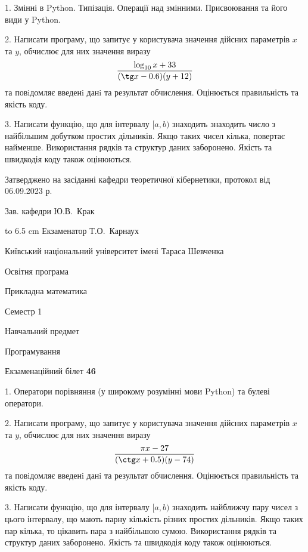 \documentclass[12pt, ukrainian]{article}
\begin{document}
{%
1. Змінні в Python. Типізація. Операції над змінними. Присвоювання та його види у Python.%
\par
2. Написати програму, що запитує у користувача значення дійсних параметрів $x$ та $y$, обчислює для них значення виразу 
$$\frac{\log_{10} x + 33}{(\tg x - 0.6) (y + 12)}$$ 
та повiдомляє введенi данi та результат обчислення.
 Оцінюється правильність та якість коду.

\par
3. Написати функцію, що для інтервалу $[a, b)$ знаходить знаходить число з найбільшим добутком простих дільників. Якщо таких чисел кілька, повертає найменше.  Використання рядків та структур даних заборонено. Якість та швидкодія коду також оцінюються. 

}
{\smallskip\smallskip \begin {scriptsize} Затверджено на засіданні кафедри теоретичної кібернетики, протокол   від   06.09.2023 р.\par\smallskip\smallskip\smallskip\smallskip
{\parbox {6.5 cm} {Зав. кафедри \dotfill Ю.В.~Крак}}\hspace {0.7cm} {\hbox to 6.5 cm { Екзаменатор \dotfill Т.О.~Карнаух}} \end{scriptsize}}
\newpage
{{\begin {scriptsize}\par
{ \center  Київський національний університет імені Тараса Шевченка \par}
{\parbox {5 cm}{Освітня програма \hfill}{\parbox {7 cm}{Прикладна математика\hfill}}\parbox {6 cm}{\hfill Семестр 1}}\par
{\parbox {5 cm} {Навчальний предмет \hfill}\parbox {7 cm}{Програмування \hfill}\parbox {6cm}{\hfill}\par}\vspace{-15pt} \end{scriptsize}}{\center Екзаменаційний білет \No \textbf { 46 }\par}}
{%
1. Оператори порівняння (у широкому розумінні мови Python) та булеві оператори.%
\par
2. Написати програму, що запитує у користувача значення дійсних параметрів $x$ та $y$, обчислює для них значення виразу 
$$\frac{\pi x - 27}{(\ctg x + 0.5) (y - 74)}$$ 
та повiдомляє введенi данi та результат обчислення.
 Оцінюється правильність та якість коду.

\par
3. Написати функцію, що для інтервалу $[a, b)$ знаходить найближчу пару чисел з цього інтервалу, що мають парну кількість різних простих дільників. Якщо таких пар кілька, то цікавить пара з найбільшою сумою.  Використання рядків та структур даних заборонено. Якість та швидкодія коду також оцінюються. 

}
\end{document}
